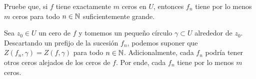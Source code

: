 \begin{exercise}
Pruebe que, si $f$ tiene exactamente $m$ ceros en $U$, entonces $f_n$ tiene por lo menos $m$ ceros para todo $n \in \mathbb N$ suficientemente grande.
\end{exercise}

\begin{solution}
Sea $z_0 \in U$ un cero de $f$ y tomemos un pequeño círculo $\gamma \subset U$ alrededor de $z_0$. Descartando un prefijo de la sucesión $f_n$, podemos suponer que $Z(f_n, \gamma) = Z(f, \gamma)$ para todo $n \in \mathbb N$. Adicionalmente, cada $f_n$ podría tener otros ceros alejados de los ceros de $f$. Por ende, cada $f_n$ tiene por lo menos $m$ ceros.
\end{solution}
